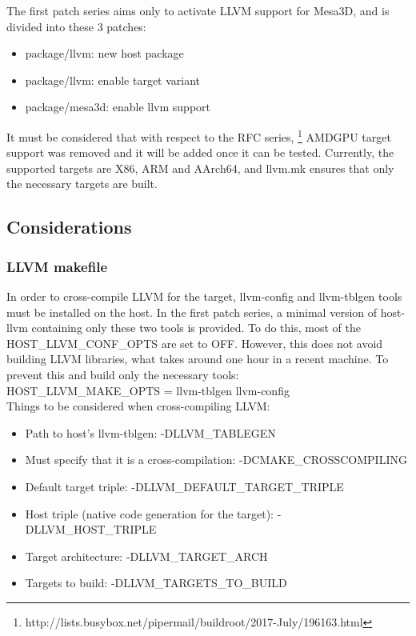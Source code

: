 \documentclass[12pt,a4paper,oneside]{article}
\begin{document}
The first patch series aims only to activate LLVM support for Mesa3D, and is divided
into these 3 patches:
\begin{itemize}
  \item package/llvm: new host package
  \item package/llvm: enable target variant
  \item package/mesa3d: enable llvm support
\end{itemize}

It must be considered that with respect to the RFC series,
\footnote{http://lists.busybox.net/pipermail/buildroot/2017-July/196163.html}
AMDGPU target support was removed and it will be added once it can be tested. Currently,
the supported targets are X86, ARM and AArch64, and llvm.mk ensures that only
the necessary targets are built.

\subsection*{Considerations}

\subsubsection*{LLVM makefile}
In order to cross-compile LLVM for the target, llvm-config and llvm-tblgen tools
must be installed on the host. In the first patch series, a minimal version of
host-llvm containing only these two tools is provided. To do this, most of the
{\selectfont HOST\_LLVM\_CONF\_OPTS} are set to OFF. However,
this does not avoid building LLVM libraries, what takes around one hour in a
recent machine. To prevent this and build only the necessary tools:\\
{\selectfont HOST\_LLVM\_MAKE\_OPTS = llvm-tblgen llvm-config}\\

Things to be considered when cross-compiling LLVM:
\begin{itemize}
  \item Path to host's llvm-tblgen: {\selectfont
  -DLLVM\_TABLEGEN}
  \item Must specify that it is a cross-compilation: {\selectfont
  -DCMAKE\_CROSSCOMPILING}
  \item Default target triple: {\selectfont
  -DLLVM\_DEFAULT\_TARGET\_TRIPLE}
  \item Host triple (native code generation for the target): {\selectfont
  -DLLVM\_HOST\_TRIPLE}
  \item Target architecture: {\selectfont
  -DLLVM\_TARGET\_ARCH}
  \item Targets to build: {\selectfont
  -DLLVM\_TARGETS\_TO\_BUILD}
\end{itemize}
\end{document}
